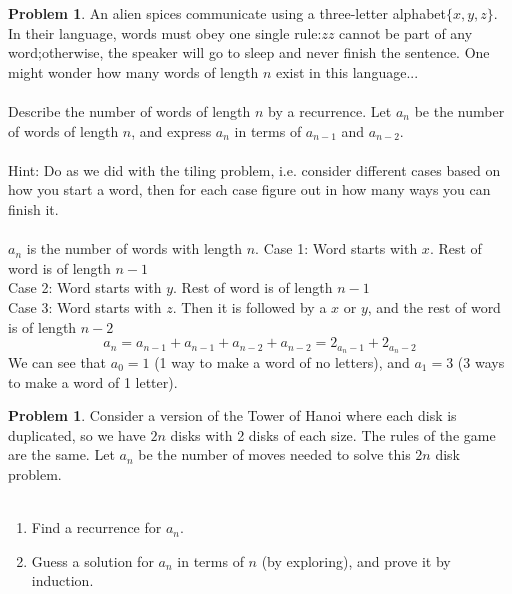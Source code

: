 \documentclass[10pt,leqno ]{article}
\theoremstyle{definition}
\newtheorem{problem}[theorem]{Problem}
\begin{document}
\begin{problem} An  alien  spices  communicate  using  a  three-letter  alphabet$\{x,y,z\}$.   In  their language,  words  must  obey  one  single  rule:$zz$ cannot  be  part  of  any  word;otherwise, the speaker will go to sleep and never finish the sentence.  One might wonder how many words of length $n$ exist in this language...
\\\\
Describe the number of words of length $n$ by a recurrence.  Let $a_n$ 
be the number of words of length $n$, and express $a_n$ in terms of $a_{n-1}$ and $a_{n-2}$.
\\\\
Hint:  Do as we did with the tiling problem, i.e.  consider different cases based on how you start a word, then for each case figure out in how many ways you can finish it.
\\\\
\Large
$a_n$ is the number of words with length $n$.
Case 1: Word starts with $x$.  Rest of word is of length $n-1$\\
Case 2: Word starts with $y$.  Rest of word is of length $n-1$\\
Case 3: Word starts with $z$.  Then it is followed by a $x$ or $y$, and the rest of word is of length $n-2$\\
$$a_n = a_{n-1} + a_{n-1} + a_{n-2} + a_{n-2} = 2_{a_n - 1} + 2_{a_n - 2}$$
We can see that $a_0 = 1$ (1 way to make a word of no letters), and $a_1 = 3$ (3 ways to make a word of 1 letter).
\end{problem}
\newpage

\begin{problem} Consider a version of the Tower of Hanoi where each disk is duplicated, so we have $2n$ disks with 2 disks of each size.  The rules of the game are the same.  Let $a_n$ be the number of moves needed to solve this $2n$ disk problem.
\\\\
\begin{enumerate}
\item Find a recurrence for $a_n$.
\item Guess a solution for $a_n$ in terms of $n$ (by exploring), and prove it by induction.
\end{enumerate}
\Large
\end{problem}
\newpage
\end{document}
